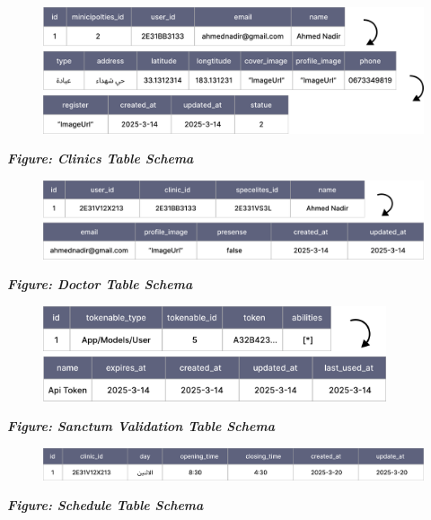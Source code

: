 \documentclass[12pt]{report}
\begin{document}
\begin{figure}[H]
	\centering
	\hspace*{-0.5cm}
	\includegraphics[width=1.1\textwidth]{images/clinic_table@2x.pdf}
\end{figure}
\begin{center}
	\textbf{\textit{Figure: Clinics Table Schema}}
\end{center}


\begin{figure}[H]
	\centering
	\hspace*{-0.7cm}
	\includegraphics[width=1.1\textwidth]{images/doctor_table@2x.pdf}
\end{figure}
\begin{center}
	\textbf{\textit{Figure: Doctor Table Schema}}
\end{center}

\begin{figure}[H]
	\centering
	\includegraphics[width=0.9\textwidth]{images/sanctum_table@2x.pdf}
\end{figure}
\begin{center}
	\textbf{\textit{Figure: Sanctum Validation Table Schema}}
\end{center}

\begin{figure}[H]
	\centering
	\hspace*{-0.9cm}
	\includegraphics[width=1.1\textwidth]{images/schedule_table@2x.pdf}
\end{figure}
\begin{center}
	\textbf{\textit{Figure: Schedule Table Schema}}
\end{center}
\end{document}
